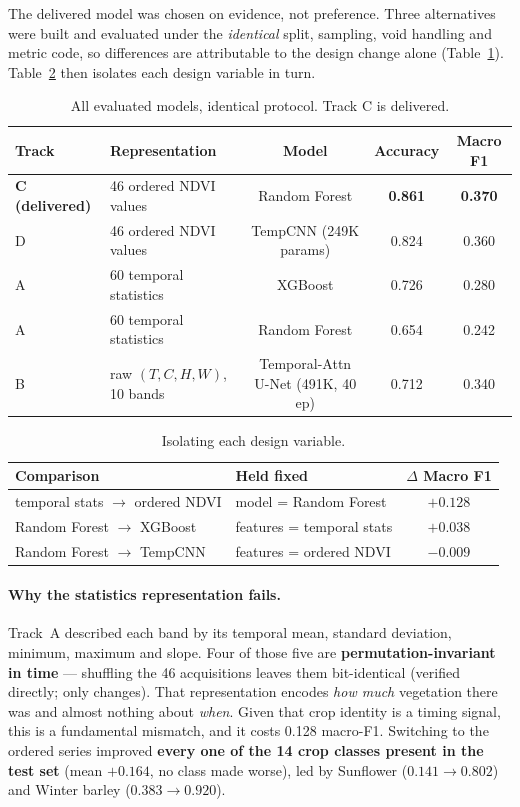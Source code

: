 \documentclass[11pt,a4paper]{article}
\newcommand{\file}[1]{\texttt{\detokenize{#1}}}
\newcommand{\bestval}[1]{\textbf{#1}}          %
\begin{document}
The delivered model was chosen on evidence, not preference. Three alternatives
were built and evaluated under the \emph{identical} split, sampling, void
handling and metric code, so differences are attributable to the design change
alone (Table~\ref{tab:alternatives}). Table~\ref{tab:ablation} then isolates
each design variable in turn.

\begin{table}[htbp]
\centering
\caption{All evaluated models, identical protocol. Track C is delivered.}
\label{tab:alternatives}
\begin{tabular}{llccc}
\toprule
\textbf{Track} & \textbf{Representation} & \textbf{Model} & \textbf{Accuracy} & \textbf{Macro F1} \\
\midrule
\textbf{C (delivered)} & 46 ordered NDVI values & Random Forest & \bestval{0.861} & \bestval{0.370} \\
D & 46 ordered NDVI values & TempCNN (249K params)     & 0.824 & 0.360 \\
A & 60 temporal statistics & XGBoost                   & 0.726 & 0.280 \\
A & 60 temporal statistics & Random Forest             & 0.654 & 0.242 \\
B & raw $(T,C,H,W)$, 10 bands & Temporal-Attn U-Net (491K, 40 ep) & 0.712 & 0.340 \\
\bottomrule
\end{tabular}
\end{table}

\begin{table}[htbp]
\centering
\caption{Isolating each design variable.}
\label{tab:ablation}
\begin{tabular}{llc}
\toprule
\textbf{Comparison} & \textbf{Held fixed} & \textbf{$\Delta$ Macro F1} \\
\midrule
temporal stats $\rightarrow$ ordered NDVI & model = Random Forest      & \bestval{$+0.128$} \\
Random Forest $\rightarrow$ XGBoost       & features = temporal stats  & $+0.038$ \\
Random Forest $\rightarrow$ TempCNN       & features = ordered NDVI    & $-0.009$ \\
\bottomrule
\end{tabular}
\end{table}

\paragraph{Why the statistics representation fails.}
Track~A described each band by its temporal mean, standard deviation, minimum,
maximum and slope. Four of those five are \textbf{permutation-invariant in
time} --- shuffling the 46 acquisitions leaves them bit-identical (verified
directly; only \file{slope} changes). That representation encodes \emph{how
much} vegetation there was and almost nothing about \emph{when}. Given that crop
identity is a timing signal, this is a fundamental mismatch, and it costs 0.128
macro-F1. Switching to the ordered series improved \textbf{every one of the 14
crop classes present in the test set} (mean $+0.164$, no class made worse), led
by Sunflower ($0.141 \rightarrow 0.802$) and Winter barley
($0.383 \rightarrow 0.920$).
\end{document}
